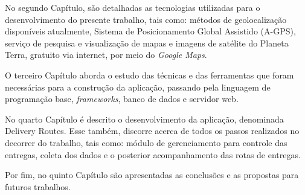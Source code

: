 No segundo Capítulo, são detalhadas as tecnologias utilizadas para o desenvolvimento do presente trabalho, tais como: métodos de geolocalização disponíveis atualmente, Sistema de Posicionamento Global Assistido (A-GPS), serviço de pesquisa e visualização de mapas e imagens de satélite do Planeta Terra, gratuito via internet, por meio do \textit{Google Maps}.

O terceiro Capítulo aborda o estudo das técnicas e das ferramentas que foram necessárias para a construção da aplicação, passando pela linguagem de programação base, \textit{frameworks}, banco de dados e servidor web.

No quarto Capítulo é descrito o desenvolvimento da aplicação, denominada Delivery Routes. Esse também, discorre acerca de todos os passos realizados no decorrer do trabalho, tais como: módulo de gerenciamento para controle das entregas, coleta dos dados e o posterior acompanhamento das rotas de entregas.

Por fim, no quinto Capítulo são apresentadas as conclusões e as propostas para futuros trabalhos.